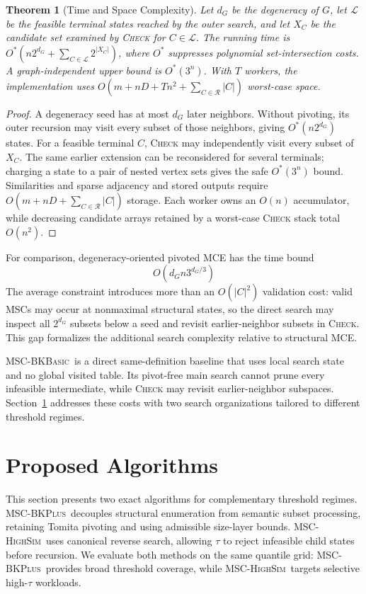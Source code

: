 \documentclass[sigconf, nonacm]{acmart}
\newtheorem{theorem}{Theorem}[section]
\newcommand{\stitle}[1]{\vspace{0.7ex} \noindent{\bf #1}}
\newcommand{\semBK}{MSC-\textsc{BKBasic}}
\newcommand{\subEnum}{MSC-\textsc{BKPlus}}
\newcommand{\monoSemMCE}{MSC-\textsc{HighSim}}
\begin{document}
\stitle{Complexity.}
\begin{theorem}[Time and Space Complexity]
  \label{the:alg1complexity}
  Let $d_G$ be the degeneracy of $G$, let $\mathcal{L}$ be the feasible
  terminal states reached by the outer search, and let $X_C$ be the candidate
  set examined by \textsc{Check} for $C\in\mathcal{L}$.  The running time is
  $O^*(n2^{d_G}+\sum_{C\in\mathcal{L}}2^{|X_C|})$, where $O^*$ suppresses
  polynomial set-intersection costs.  A graph-independent upper bound is
  $O^*(3^n)$. With $T$ workers, the implementation uses
  $O(m+nD+Tn^2+\sum_{C\in\mathcal R}|C|)$ worst-case space.
\end{theorem}
\begin{proof}
  A degeneracy seed has at most $d_G$ later neighbors.  Without pivoting, its
  outer recursion may visit every subset of those neighbors, giving
  $O^*(n2^{d_G})$ states.  For a feasible terminal $C$, \textsc{Check} may
  independently visit every subset of $X_C$.  The same earlier extension can
  be reconsidered for several terminals; charging a state to a pair of nested
  vertex sets gives the safe $O^*(3^n)$ bound.  Similarities and sparse
  adjacency and stored outputs require
  $O(m+nD+\sum_{C\in\mathcal R}|C|)$ storage. Each worker owns an $O(n)$
  accumulator, while decreasing candidate arrays retained by a worst-case
  \textsc{Check} stack total $O(n^2)$.
\end{proof}
For comparison, degeneracy-oriented pivoted MCE has the time
bound~\cite{eppstein2010,eppstein2013}
\[
O(d_Gn3^{d_G/3})
\]
The average constraint introduces more than an $O(|C|^2)$ validation cost:
valid MSCs may
occur at nonmaximal structural states, so the direct search may inspect all
$2^{d_G}$ subsets below a seed and revisit earlier-neighbor subsets in
\textsc{Check}. This gap formalizes the additional search complexity relative
to structural MCE.

\stitle{Design Implication.}
\semBK\ is a direct same-definition baseline that uses local search state and
no global visited table. Its pivot-free main search cannot prune every
infeasible intermediate, while \textsc{Check} may revisit earlier-neighbor
subspaces. Section~\ref{sec:algorithms} addresses these costs with two search
organizations tailored to different threshold regimes.


\section{Proposed Algorithms}
\label{sec:algorithms}
This section presents two exact algorithms for complementary threshold regimes.
\subEnum\ decouples structural enumeration from semantic subset processing,
retaining Tomita pivoting and using admissible size-layer bounds. \monoSemMCE\
uses canonical reverse search, allowing $\tau$ to reject infeasible child
states before recursion. We evaluate both methods on the same quantile grid:
\subEnum\ provides broad threshold coverage, while \monoSemMCE\ targets
selective high-$\tau$ workloads.
\end{document}
